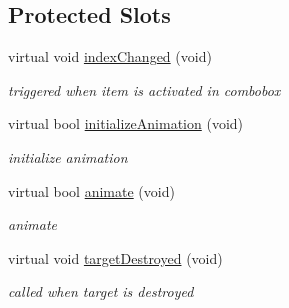 \subsection*{Protected Slots}
\begin{DoxyCompactItemize}
\item 
\mbox{\label{class_combo_box_data_a43cc6e908b538ab0f5aa24cda2ab18ef}} 
virtual void \hyperlink{class_combo_box_data_a43cc6e908b538ab0f5aa24cda2ab18ef}{index\+Changed} (void)
\begin{DoxyCompactList}\small\item\em triggered when item is activated in combobox \end{DoxyCompactList}\item 
\mbox{\label{class_combo_box_data_ad335167f8163636ead06d559cf338c3a}} 
virtual bool \hyperlink{class_combo_box_data_ad335167f8163636ead06d559cf338c3a}{initialize\+Animation} (void)
\begin{DoxyCompactList}\small\item\em initialize animation \end{DoxyCompactList}\item 
\mbox{\label{class_combo_box_data_a5eeea4482697ffbb9479a4b834b8c472}} 
virtual bool \hyperlink{class_combo_box_data_a5eeea4482697ffbb9479a4b834b8c472}{animate} (void)
\begin{DoxyCompactList}\small\item\em animate \end{DoxyCompactList}\item 
\mbox{\label{class_combo_box_data_aa87af23b23c674ab70e528aeedfcc77e}} 
virtual void \hyperlink{class_combo_box_data_aa87af23b23c674ab70e528aeedfcc77e}{target\+Destroyed} (void)
\begin{DoxyCompactList}\small\item\em called when target is destroyed \end{DoxyCompactList}\end{DoxyCompactItemize}
